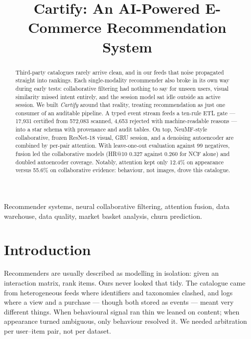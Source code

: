 \documentclass[conference]{IEEEtran}
\begin{document}
\title{Cartify: An AI-Powered E-Commerce Recommendation System}

\author{
}

\maketitle

\begin{abstract}
\noindent
Third-party catalogues rarely arrive clean, and in our feeds that noise propagated
straight into rankings. Each single-modality recommender also broke in its own way
during early tests: collaborative filtering had nothing to say for unseen users,
visual similarity missed intent entirely, and the session model sat idle outside an
active session. We built \emph{Cartify} around that reality, treating recommendation
as just one consumer of an auditable pipeline. A typed event stream feeds a ten-rule
ETL gate --- 17{,}931 certified from 572{,}083 scanned, 4{,}653 rejected with
machine-readable reasons --- into a star schema with provenance and audit tables.
On top, NeuMF-style collaborative, frozen ResNet-18 visual, GRU session, and a
denoising autoencoder are combined by per-pair attention. With leave-one-out
evaluation against 99 negatives, fusion led the collaborative models (HR@10 $0.327$
against $0.260$ for NCF alone) and doubled autoencoder coverage. Notably, attention
kept only 12.4\% on appearance versus 55.6\% on collaborative evidence: behaviour,
not images, drove this catalogue.
\end{abstract}

\begin{IEEEkeywords}
Recommender systems, neural collaborative filtering, attention fusion,
data warehouse, data quality, market basket analysis, churn prediction.
\end{IEEEkeywords}

\section{Introduction}
\label{sec:intro}

Recommenders are usually described as modelling in isolation: given an interaction
matrix, rank items. Ours never looked that tidy. The catalogue came from
heterogeneous feeds where identifiers and taxonomies clashed, and logs where a view
and a purchase --- though both stored as events --- meant very different things.
When behavioural signal ran thin we leaned on content; when appearance turned
ambiguous, only behaviour resolved it. We needed arbitration per user--item pair,
not per dataset.
\end{document}

